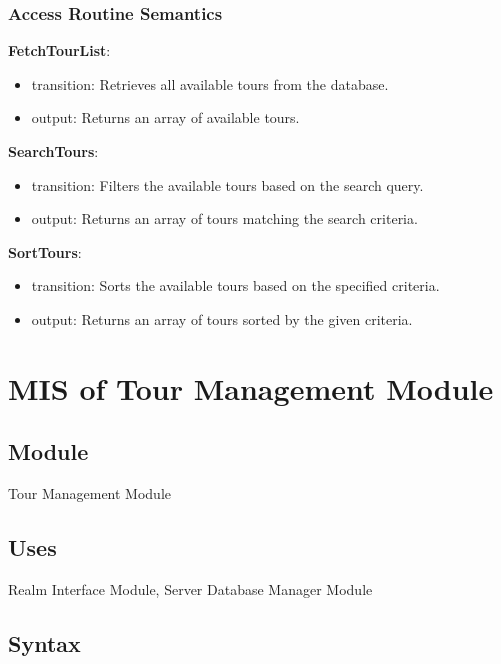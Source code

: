 \documentclass[12pt, titlepage]{article}
\begin{document}
\subsubsection{Access Routine Semantics}

\noindent \textbf{FetchTourList}:
\begin{itemize}
    \item transition: Retrieves all available tours from the database.
    \item output: Returns an array of available tours.
\end{itemize}

\noindent \textbf{SearchTours}:
\begin{itemize}
    \item transition: Filters the available tours based on the search query.
    \item output: Returns an array of tours matching the search criteria.
\end{itemize}

\noindent \textbf{SortTours}:
\begin{itemize}
    \item transition: Sorts the available tours based on the specified criteria.
    \item output: Returns an array of tours sorted by the given criteria.
\end{itemize}

\newpage

\section{MIS of Tour Management Module} \label{TourManagementModule}

\subsection{Module}

Tour Management Module

\subsection{Uses}

Realm Interface Module, Server Database Manager Module

\subsection{Syntax}
\end{document}
